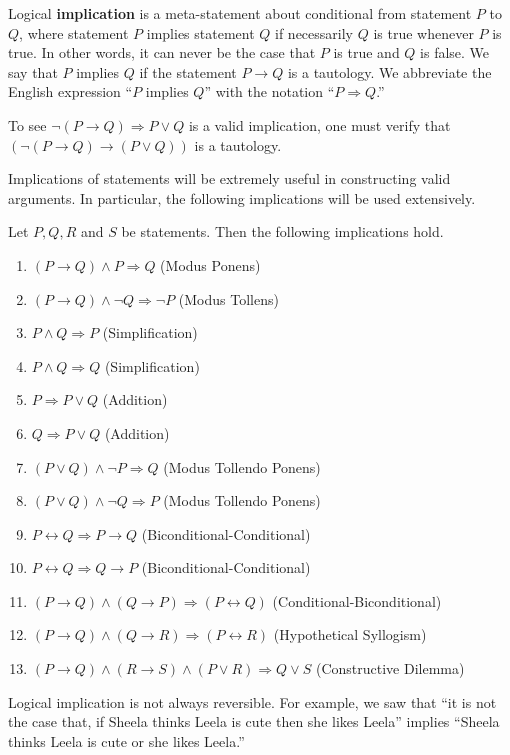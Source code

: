 \documentclass[a4paper,english,12pt]{article}
\begin{document}
\begin{defn}[Implication] Logical \textbf{implication} is a meta-statement about conditional from statement $P$ to $Q$, where statement $P$ implies statement $Q$ if necessarily $Q$ is true whenever $P$ is true. In other words, it can never be the case that $P$ is true and $Q$ is false. We say that $P$ implies $Q$ if the statement $P \rightarrow Q$ is a tautology. We abbreviate the English expression ``$P$ implies $Q$'' with the notation ``$P \Rightarrow Q$.'' 
\end{defn}
\begin{exmp} To see $\neg (P \rightarrow Q) \Rightarrow P \vee Q$ is a valid implication, one must verify that $(\neg (P \rightarrow Q) \rightarrow (P \vee Q))$ is a tautology.
\end{exmp}
Implications of statements will be extremely useful in constructing valid arguments. In particular, the following implications will be used extensively. 

\begin{thm}[Implications] Let $P,Q,R$ and $S$ be statements. Then the following implications hold.		
		\begin{enumerate}
			\item $(P\rightarrow Q)\wedge  P\Rightarrow Q$  (Modus Ponens)
			\item $(P\rightarrow Q)\wedge\neg Q\Rightarrow\neg P$ (Modus Tollens)
			\item $P\wedge Q\Rightarrow P$ (Simplification)
			\item $P\wedge Q\Rightarrow Q$ (Simplification)
			\item $P\Rightarrow P\vee Q$ (Addition)
			\item $Q\Rightarrow P\vee Q$ (Addition)
			\item $(P\vee Q)\wedge \neg P\Rightarrow Q$ (Modus Tollendo Ponens)
			\item $(P\vee Q)\wedge \neg Q\Rightarrow P$ (Modus Tollendo Ponens) 
			\item $P\leftrightarrow Q\Rightarrow P\rightarrow Q$ (Biconditional-Conditional)
			\item $P\leftrightarrow Q\Rightarrow Q\rightarrow P$ (Biconditional-Conditional)
			\item $(P\rightarrow Q)\wedge(Q\rightarrow P)\Rightarrow(P\leftrightarrow Q)$ (Conditional-Biconditional)
			\item $(P\rightarrow Q)\wedge(Q\rightarrow R)\Rightarrow(P\leftrightarrow R)$ (Hypothetical Syllogism)
			\item $(P\rightarrow Q)\wedge(R\rightarrow S)\wedge(P\vee R)\Rightarrow Q\vee S$ (Constructive Dilemma)			
		\end{enumerate}	
\end{thm}
\begin{rem} Logical implication is not always reversible. For example, we saw that “it is not the case that, if Sheela thinks Leela is cute then she likes Leela” implies “Sheela thinks Leela is cute or she likes Leela.”
\end{rem}
\end{document}
